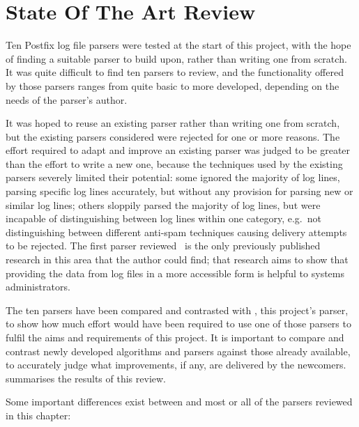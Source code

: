 \chapter{State Of The Art Review}

\label{state of the art review}

Ten Postfix log file parsers were tested at the start of this project, with
the hope of finding a suitable parser to build upon, rather than writing
one from scratch.  It was quite difficult to find ten parsers to review,
and the functionality offered by those parsers ranges from quite basic to
more developed, depending on the needs of the parser's author.

It was hoped to reuse an existing parser rather than writing one from
scratch, but the existing parsers considered were rejected for one or more
reasons.  The effort required to adapt and improve an existing parser was
judged to be greater than the effort to write a new one, because the
techniques used by the existing parsers severely limited their potential:
some ignored the majority of log lines, parsing specific log lines
accurately, but without any provision for parsing new or similar log lines;
others sloppily parsed the majority of log lines, but were incapable of
distinguishing between log lines within one category, e.g.\ not
distinguishing between different anti-spam techniques causing delivery
attempts to be rejected.  The first parser
reviewed~\cite{log-mail-analyser} is the only previously published research
in this area that the author could find; that research aims to show that
providing the data from log files in a more accessible form is helpful to
systems administrators.

The ten parsers have been compared and contrasted with \parsername{}, this
project's parser, to show how much effort would have been required to use
one of those parsers to fulfil the aims and requirements of this project.
It is important to compare and contrast newly developed algorithms and
parsers against those already available, to accurately judge what
improvements, if any, are delivered by the newcomers.   summarises the results of this review.

Some important differences exist between \parsername{} and most or all of
the parsers reviewed in this chapter:

